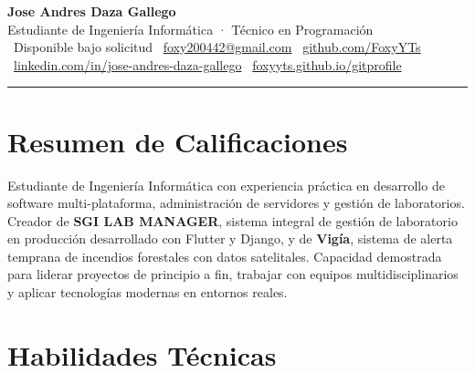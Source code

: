 \documentclass[11pt, a4paper]{article}
\begin{document}
\begin{center}
  {\Huge\bfseries\color{primary} Jose Andres Daza Gallego}\\[4pt]
  {\large\color{accent} Estudiante de Ingeniería Informática · Técnico en Programación}\\[8pt]
  \small
  \faPhone\ Disponible bajo solicitud \quad
  \faEnvelope\ \href{mailto:foxy200442@gmail.com}{foxy200442@gmail.com} \quad
  \faGithub\ \href{https://github.com/FoxyYTs}{github.com/FoxyYTs}\\[3pt]
  \faLinkedin\ \href{https://www.linkedin.com/in/jose-andres-daza-gallego/}{linkedin.com/in/jose-andres-daza-gallego} \quad
  \faGlobe\ \href{https://foxyyts.github.io/gitprofile/}{foxyyts.github.io/gitprofile}
\end{center}

\vspace{2pt}
{\color{rulecol}\rule{\textwidth}{1.5pt}}
\vspace{2pt}

\section{Resumen de Calificaciones}

Estudiante de Ingeniería Informática con experiencia práctica en desarrollo de software
multi-plataforma, administración de servidores y gestión de laboratorios. Creador de
\textbf{SGI LAB MANAGER}, sistema integral de gestión de laboratorio en producción desarrollado
con Flutter y Django, y de \textbf{Vigía}, sistema de alerta temprana de incendios
forestales con datos satelitales. Capacidad demostrada para liderar proyectos de principio a fin,
trabajar con equipos multidisciplinarios y aplicar tecnologías modernas en entornos reales.

\section{Habilidades Técnicas}
\end{document}
